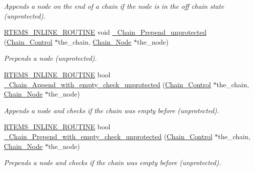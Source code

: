 \begin{DoxyCompactItemize}
\begin{DoxyCompactList}\small\item\em Appends a node on the end of a chain if the node is in the off chain state (unprotected). \end{DoxyCompactList}\item 
\mbox{\hyperlink{group__RTEMSScoreBaseDefs_gac216239df231d5dbd15e3520b0b9313f}{R\+T\+E\+M\+S\+\_\+\+I\+N\+L\+I\+N\+E\+\_\+\+R\+O\+U\+T\+I\+NE}} void \mbox{\hyperlink{group__RTEMSScoreChain_ga8d8497bea6684f4c685056c75f35522c}{\+\_\+\+Chain\+\_\+\+Prepend\+\_\+unprotected}} (\mbox{\hyperlink{unionChain__Control}{Chain\+\_\+\+Control}} $\ast$the\+\_\+chain, \mbox{\hyperlink{group__RTEMSScoreChain_ga0dd4bfcca1ac7f90de2842e447846d3d}{Chain\+\_\+\+Node}} $\ast$the\+\_\+node)
\begin{DoxyCompactList}\small\item\em Prepends a node (unprotected). \end{DoxyCompactList}\item 
\mbox{\hyperlink{group__RTEMSScoreBaseDefs_gac216239df231d5dbd15e3520b0b9313f}{R\+T\+E\+M\+S\+\_\+\+I\+N\+L\+I\+N\+E\+\_\+\+R\+O\+U\+T\+I\+NE}} bool \mbox{\hyperlink{group__RTEMSScoreChain_ga4cc284fe01b5b460db37b23f230599af}{\+\_\+\+Chain\+\_\+\+Append\+\_\+with\+\_\+empty\+\_\+check\+\_\+unprotected}} (\mbox{\hyperlink{unionChain__Control}{Chain\+\_\+\+Control}} $\ast$the\+\_\+chain, \mbox{\hyperlink{group__RTEMSScoreChain_ga0dd4bfcca1ac7f90de2842e447846d3d}{Chain\+\_\+\+Node}} $\ast$the\+\_\+node)
\begin{DoxyCompactList}\small\item\em Appends a node and checks if the chain was empty before (unprotected). \end{DoxyCompactList}\item 
\mbox{\hyperlink{group__RTEMSScoreBaseDefs_gac216239df231d5dbd15e3520b0b9313f}{R\+T\+E\+M\+S\+\_\+\+I\+N\+L\+I\+N\+E\+\_\+\+R\+O\+U\+T\+I\+NE}} bool \mbox{\hyperlink{group__RTEMSScoreChain_ga67db4dd4a19900b5f2f912432bf545ea}{\+\_\+\+Chain\+\_\+\+Prepend\+\_\+with\+\_\+empty\+\_\+check\+\_\+unprotected}} (\mbox{\hyperlink{unionChain__Control}{Chain\+\_\+\+Control}} $\ast$the\+\_\+chain, \mbox{\hyperlink{group__RTEMSScoreChain_ga0dd4bfcca1ac7f90de2842e447846d3d}{Chain\+\_\+\+Node}} $\ast$the\+\_\+node)
\begin{DoxyCompactList}\small\item\em Prepends a node and checks if the chain was empty before (unprotected). \end{DoxyCompactList}\item 

\end{DoxyCompactItemize}
